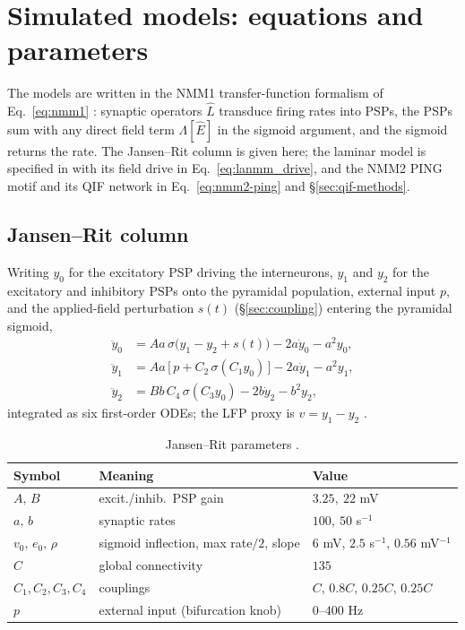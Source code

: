 \documentclass[11pt,a4paper]{article}
\newcommand{\Sig}{\sigma}
\begin{document}
\section{Simulated models: equations and parameters}\label{app:models}
The models are written in the NMM1 transfer-function formalism of Eq.~\eqref{eq:nmm1}
\cite{ruffini2025rosetta}: synaptic operators $\hat L$ transduce firing rates into PSPs, the
PSPs sum with any direct field term $\Lambda[\hat E]$ in the sigmoid argument, and the sigmoid
returns the rate. The Jansen--Rit column is given here; the laminar model is specified in
\cite{ruffini2025cfc,sanchezTodo2023} with its field drive in Eq.~\eqref{eq:lanmm_drive}, and
the NMM2 PING motif and its QIF network in Eq.~\eqref{eq:nmm2-ping} and \S\ref{sec:qif-methods}.

\subsection*{Jansen--Rit column}
Writing $y_0$ for the excitatory PSP driving the interneurons, $y_1$ and $y_2$ for the
excitatory and inhibitory PSPs onto the pyramidal population, external input $p$, and the
applied-field perturbation $s(t)$ (\S\ref{sec:coupling}) entering the pyramidal sigmoid,
\begin{align}
\ddot y_0 &= Aa\,\Sig\!\big(y_1-y_2+s(t)\big)-2a\dot y_0-a^2 y_0, \label{eq:jr0}\\
\ddot y_1 &= Aa\,\big[\,p+C_2\,\Sig(C_1 y_0)\,\big]-2a\dot y_1-a^2 y_1,\\
\ddot y_2 &= Bb\,C_4\,\Sig(C_3 y_0)-2b\dot y_2-b^2 y_2,
\end{align}
integrated as six first-order ODEs; the LFP proxy is $v=y_1-y_2$ \cite{jansen1995}.

\begin{table}[h]\centering\small
\caption{Jansen--Rit parameters \cite{jansen1995}.}
\label{tab:params}
\begin{tabular}{@{}lll@{}}
\toprule
Symbol & Meaning & Value\\
\midrule
$A,\,B$ & excit./inhib.\ PSP gain & $3.25,\ 22$ mV\\
$a,\,b$ & synaptic rates & $100,\ 50$ s$^{-1}$\\
$v_0,\,e_0,\,\rho$ & sigmoid inflection, max rate$/2$, slope & $6$ mV, $2.5$ s$^{-1}$, $0.56$ mV$^{-1}$\\
$C$ & global connectivity & $135$\\
$C_1,C_2,C_3,C_4$ & couplings & $C,\,0.8C,\,0.25C,\,0.25C$\\
$p$ & external input (bifurcation knob) & $0$--$400$ Hz\\
\bottomrule
\end{tabular}
\end{table}
\end{document}
